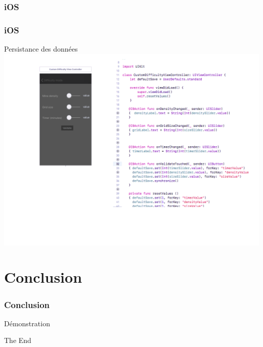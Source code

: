 \documentclass{beamer}
\begin{document}
\begin{frame}
\frametitle{iOS}
	\frametitle{iOS}
	\begin{block}{Persistance des données}
 		\includegraphics[scale=0.30]{Images/persistanceSliders.png}
	\end{block}
\end{frame}

\section{Conclusion}

\begin{frame}
\frametitle{Conclusion}
	\Huge{\centerline{Démonstration}}
\end{frame}


\begin{frame}
\Huge{\centerline{The End}}
\end{frame}

\end{document}
